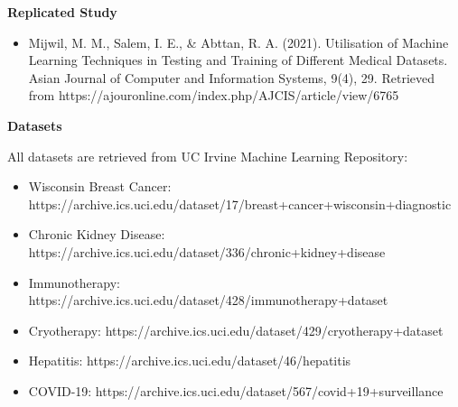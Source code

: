 \documentclass[11pt]{article}
\providecommand{\tightlist}{%
      \setlength{\itemsep}{0pt}\setlength{\parskip}{0pt}}
\begin{document}
    \textbf{Replicated Study}

    \begin{itemize}
\tightlist
\item
  Mijwil, M. M., Salem, I. E., \& Abttan, R. A. (2021). Utilisation of
  Machine Learning Techniques in Testing and Training of Different
  Medical Datasets. Asian Journal of Computer and Information Systems,
  9(4), 29. Retrieved from
  https://ajouronline.com/index.php/AJCIS/article/view/6765
\end{itemize}

    \textbf{Datasets}

    All datasets are retrieved from UC Irvine Machine Learning Repository:

\begin{itemize}
\tightlist
\item
  Wisconsin Breast Cancer:
  https://archive.ics.uci.edu/dataset/17/breast+cancer+wisconsin+diagnostic
\item
  Chronic Kidney Disease:
  https://archive.ics.uci.edu/dataset/336/chronic+kidney+disease
\item
  Immunotherapy:
  https://archive.ics.uci.edu/dataset/428/immunotherapy+dataset
\item
  Cryotherapy:
  https://archive.ics.uci.edu/dataset/429/cryotherapy+dataset
\item
  Hepatitis: https://archive.ics.uci.edu/dataset/46/hepatitis
\item
  COVID-19:
  https://archive.ics.uci.edu/dataset/567/covid+19+surveillance
\end{itemize}


    
    
    
\end{document}
